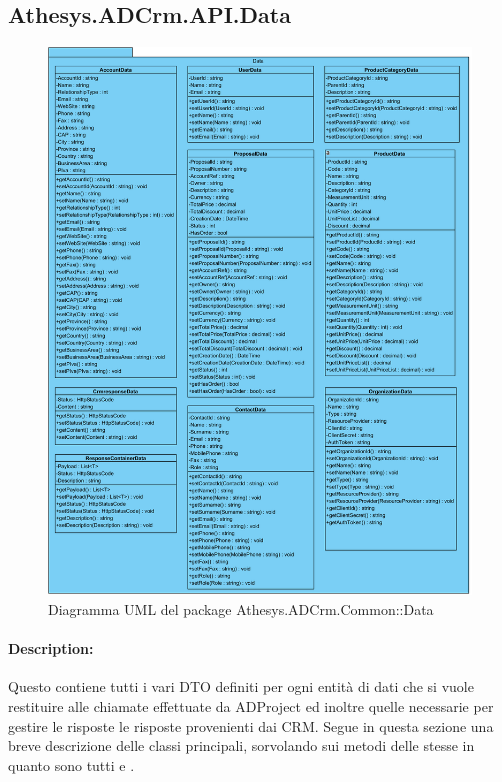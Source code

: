 \subsection{Athesys.ADCrm.API.Data}
\begin{figure}[H]
	\centering
	\includegraphics[width=\linewidth]{images/modules/Data}
	\caption{Diagramma UML del package Athesys.ADCrm.Common::Data}
	\label{fig:data}
\end{figure}

\paragraph{Description:}
Questo  contiene tutti i vari DTO definiti per ogni entità di dati che si vuole restituire alle chiamate effettuate da ADProject ed inoltre quelle necessarie per gestire le risposte le risposte provenienti dai CRM. 
Segue in questa sezione una breve descrizione delle classi principali, sorvolando sui metodi delle stesse in quanto sono tutti   e .


